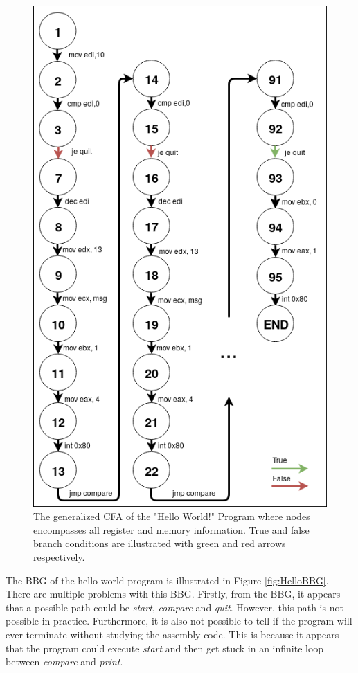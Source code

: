\documentclass{kththesis}
\renewcommand{\it}[1]{\textit{#1}}
\begin{document}
\begin{figure}[!t]
    \centering
    \includegraphics[scale=0.4]{Images/CFA.png}
    \caption[The generalized CFA of the "Hello World!" Program where nodes encompasses all register and memory information.]{The generalized CFA of the "Hello World!" Program where nodes encompasses all register and memory information. True and false branch conditions are illustrated with green and red arrows respectively.}
    \label{fig:HelloCFA}
\end{figure}
\clearpage
\noindent
The BBG of the hello-world program is illustrated in Figure \ref{fig:HelloBBG}. There are multiple problems with this BBG. Firstly, from the BBG, it appears that a possible path could be \it{start}, \it{compare} and \it{quit}. However, this path is not possible in practice. Furthermore, it is also not possible to tell if the program will ever terminate without studying the assembly code. This is because it appears that the program could execute \it{start} and then get stuck in an infinite loop between \it{compare} and \it{print}.
\end{document}
